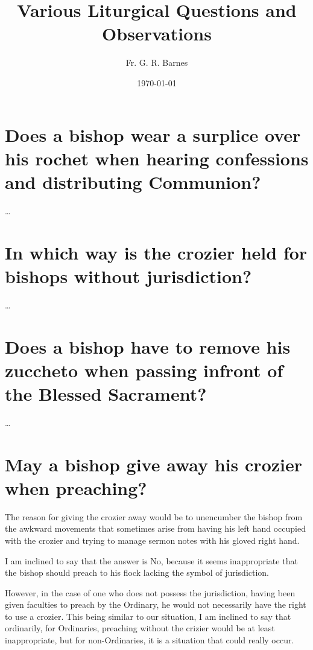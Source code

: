 \documentclass[10pt]{article}
\begin{document}
\title{Various Liturgical Questions and Observations}
\author{Fr. G. R. Barnes}
\date{\today}

\maketitle

\tableofcontents

\pagebreak


\pagebreak


\section{Does a bishop wear a surplice over his rochet when hearing confessions
and distributing Communion?}

\dots

\section{In which way is the crozier held for bishops without jurisdiction?}

\dots

\section{Does a bishop have to remove his zuccheto when passing infront of the
Blessed Sacrament?}

\dots

\section{May a bishop give away his crozier when preaching?}

The reason for giving the crozier away would be to unencumber the bishop from
the awkward movements that sometimes arise from having his left hand occupied
with the crozier and trying to manage sermon notes with his gloved right hand.

I am inclined to say that the answer is No, because it seems inappropriate that
the bishop should preach to his flock lacking the symbol of jurisdiction.

However, in the case of one who does not possess the jurisdiction, having been
given faculties to preach by the Ordinary, he would not necessarily have the
right to use a crozier. This being similar to our situation, I am inclined to
say that ordinarily, for Ordinaries, preaching without the crizier would be at
least inappropriate, but for non-Ordinaries, it is a situation that could really
occur. 
\end{document}
